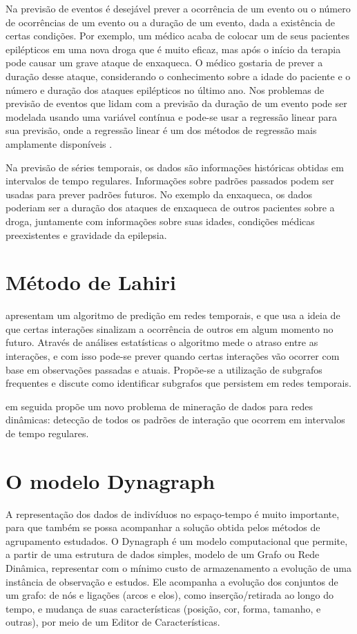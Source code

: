 Na previsão de eventos é desejável prever a ocorrência de um evento ou o número de ocorrências de um evento ou a duração de um evento, dada a existência de certas condições. Por exemplo, um médico acaba de colocar um de seus pacientes epilépticos em uma nova droga que é muito eficaz, mas após o início da terapia pode causar um grave ataque de enxaqueca. O médico gostaria de prever a duração desse ataque, considerando o conhecimento sobre a idade do paciente e o número e duração dos ataques epilépticos no último ano. Nos problemas de previsão de eventos que lidam com a previsão da duração de um evento pode ser modelada usando uma variável contínua e pode-se usar a regressão linear para sua previsão, onde a regressão linear é um dos métodos de regressão mais amplamente disponíveis \cite{Mitsa:2010}.

Na previsão de séries temporais, os dados são informações históricas obtidas em intervalos de tempo regulares. Informações sobre padrões passados podem ser usadas para prever padrões futuros. No exemplo da enxaqueca, os dados poderiam ser a duração dos ataques de enxaqueca de outros pacientes sobre a droga, juntamente com informações sobre suas idades, condições médicas preexistentes e gravidade da epilepsia.

\section{Método de Lahiri}
\label{lahiri}
 apresentam um algoritmo de predição em redes temporais, e que usa a ideia de que certas interações sinalizam a ocorrência de outros em algum momento no futuro. Através de análises estatísticas o algoritmo mede o atraso entre as interações, e com isso pode-se prever quando certas interações vão ocorrer com base em observações passadas e atuais. Propõe-se a utilização de subgrafos frequentes e discute como identificar subgrafos que persistem em redes temporais.

 em seguida propõe um novo problema de mineração de dados para redes dinâmicas: detecção de todos os padrões de interação que ocorrem em intervalos de tempo regulares.

\section{O modelo Dynagraph}

A representação dos dados de indivíduos no espaço-tempo é muito importante, para que também se possa acompanhar a solução obtida pelos métodos de agrupamento estudados. O Dynagraph \cite{dynagraph} é um modelo computacional que permite, a partir de uma estrutura de dados simples, modelo de um Grafo ou Rede Dinâmica, representar com o mínimo custo de armazenamento a evolução de uma instância de observação e estudos. Ele acompanha a evolução dos conjuntos de um grafo: de nós e ligações (arcos e elos), como inserção/retirada ao longo do tempo, e mudança de suas características (posição, cor, forma, tamanho, e outras), por meio de um Editor de Características.

